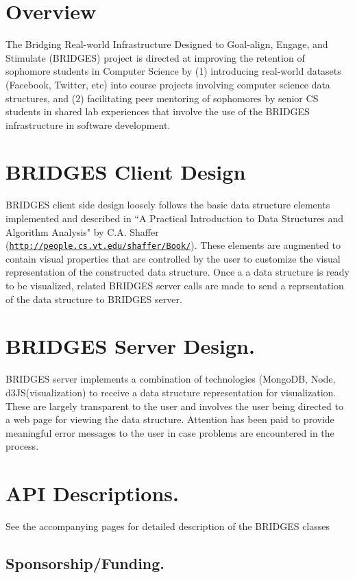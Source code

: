 \hypertarget{index_overview_sec}{}\section{Overview}\label{index_overview_sec}
The Bridging Real-\/world Infrastructure Designed to Goal-\/align, Engage, and Stimulate (B\+R\+I\+D\+G\+E\+S) project is directed at improving the retention of sophomore students in Computer Science by (1) introducing real-\/world datasets (Facebook, Twitter, etc) into course projects involving computer science data structures, and (2) facilitating peer mentoring of sophomores by senior C\+S students in shared lab experiences that involve the use of the B\+R\+I\+D\+G\+E\+S infrastructure in software development. \hypertarget{index_br_client}{}\section{B\+R\+I\+D\+G\+E\+S Client Design}\label{index_br_client}
B\+R\+I\+D\+G\+E\+S client side design loosely follows the basic data structure elements implemented and described in ``\+A Practical Introduction to Data Structures and Algorithm Analysis" by C.\+A. Shaffer (\href{http://people.cs.vt.edu/shaffer/Book/}{\tt http\+://people.\+cs.\+vt.\+edu/shaffer/\+Book/}). These elements are augmented to contain visual properties that are controlled by the user to customize the visual representation of the constructed data structure. Once a a data structure is ready to be visualized, related B\+R\+I\+D\+G\+E\+S server calls are made to send a reprsentation of the data structure to B\+R\+I\+D\+G\+E\+S server. \hypertarget{index_br_server}{}\section{B\+R\+I\+D\+G\+E\+S Server Design.}\label{index_br_server}
B\+R\+I\+D\+G\+E\+S server implements a combination of technologies (Mongo\+D\+B, Node, d3\+J\+S(visualization) to receive a data structure representation for visualization. These are largely transparent to the user and involves the user being directed to a web page for viewing the data structure. Attention has been paid to provide meaningful error messages to the user in case problems are encountered in the process. \hypertarget{index_api_sec}{}\section{A\+P\+I Descriptions.}\label{index_api_sec}
See the accompanying pages for detailed description of the B\+R\+I\+D\+G\+E\+S classes \hypertarget{index_sponsor_sec}{}\subsection{Sponsorship/\+Funding.}\label{index_sponsor_sec}
